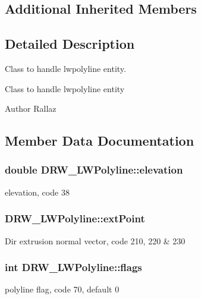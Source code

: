 \subsection*{Additional Inherited Members}


\subsection{Detailed Description}
Class to handle lwpolyline entity. 

Class to handle lwpolyline entity \begin{DoxyAuthor}{Author}
Rallaz 
\end{DoxyAuthor}


\subsection{Member Data Documentation}
\hypertarget{class_d_r_w___l_w_polyline_a86ba4b8badb8f008997401ec9f084a3b}{}
\subsubsection[{elevation}]{\setlength{\rightskip}{0pt plus 5cm}double D\+R\+W\+\_\+\+L\+W\+Polyline\+::elevation}\label{class_d_r_w___l_w_polyline_a86ba4b8badb8f008997401ec9f084a3b}
elevation, code 38 \hypertarget{class_d_r_w___l_w_polyline_a859105f0a27e812dc074483809a38194}{}
\subsubsection[{ext\+Point}]{ D\+R\+W\+\_\+\+L\+W\+Polyline\+::ext\+Point}\label{class_d_r_w___l_w_polyline_a859105f0a27e812dc074483809a38194}
Dir extrusion normal vector, code 210, 220 \& 230 \hypertarget{class_d_r_w___l_w_polyline_a66f6b406675a3c4ef540099356973510}{}
\subsubsection[{flags}]{\setlength{\rightskip}{0pt plus 5cm}int D\+R\+W\+\_\+\+L\+W\+Polyline\+::flags}\label{class_d_r_w___l_w_polyline_a66f6b406675a3c4ef540099356973510}
polyline flag, code 70, default 0 \hypertarget{class_d_r_w___l_w_polyline_abab38cc3e874a5c89469b382ebeb2284}{}
